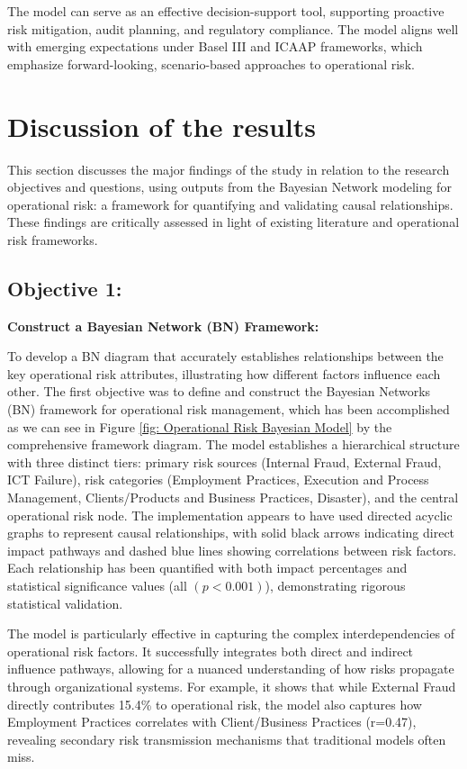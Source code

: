The model can serve as an effective decision-support tool, supporting proactive risk mitigation, audit planning, and regulatory compliance. The model aligns well with emerging expectations under Basel III and ICAAP frameworks, which emphasize forward-looking, scenario-based approaches to operational risk.

\section{Discussion of the results}
This section discusses the major findings of the study in relation to the research objectives and questions, using outputs from the Bayesian Network modeling for operational risk: a framework for quantifying and validating causal relationships. These findings are critically assessed in light of existing literature and operational risk frameworks.

\subsection{Objective 1:}
\textbf{Construct a Bayesian Network (BN) Framework: }

To develop a BN diagram that accurately establishes relationships between the key operational risk attributes, illustrating how different factors influence each other.
The first objective was to define and construct the Bayesian Networks (BN) framework for operational risk management, which has been accomplished as we can see in Figure \ref{fig: Operational Risk Bayesian Model} by the comprehensive framework diagram. The model establishes a hierarchical structure with three distinct tiers: primary risk sources (Internal Fraud, External Fraud, ICT Failure), risk categories (Employment Practices, Execution and Process Management, Clients/Products and Business Practices, Disaster), and the central operational risk node. The implementation appears to have used directed acyclic graphs to represent causal relationships, with solid black arrows indicating direct impact pathways and dashed blue lines showing correlations between risk factors. Each relationship has been quantified with both impact percentages and statistical significance values (all $(p < 0.001)$), demonstrating rigorous statistical validation.

The model is particularly effective in capturing the complex interdependencies of operational risk factors. It successfully integrates both direct and indirect influence pathways, allowing for a nuanced understanding of how risks propagate through organizational systems. For example, it shows that while External Fraud directly contributes 15.4\% to operational risk, the model also captures how Employment Practices correlates with Client/Business Practices (r=0.47), revealing secondary risk transmission mechanisms that traditional models often miss.

